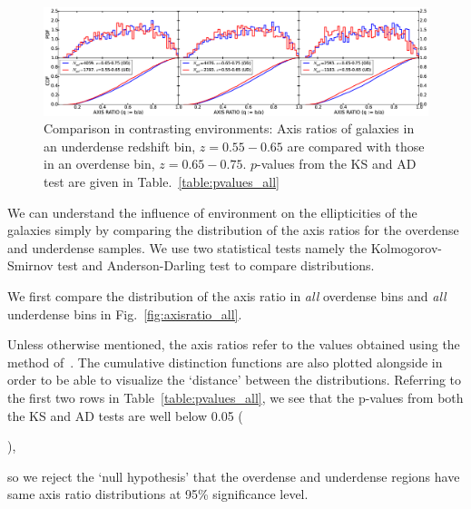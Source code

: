 \documentclass[twocolumn,useAMS,usenatbib]{mn2e}
\newcommand{\rachel}[1]{}
\newcommand{\arun}[1]{}
\begin{document}
\begin{figure}
 \centering
 \includegraphics[width=2.3\columnwidth]{axis_ratio_odud}
 \caption{Comparison in contrasting environments: Axis ratios of galaxies in an underdense redshift bin, $z=0.55-0.65$ are compared with those in an overdense bin, $z=0.65-0.75$. $p$-values from the KS and AD test are given in Table.~\ref{table:pvalues_all}}
 \label{fig:axisratio_contrasting}
\end{figure}

We can understand the influence of environment on the ellipticities of the galaxies simply by comparing the distribution of the axis ratios for the overdense and underdense samples. 
We use two statistical tests namely the Kolmogorov-Smirnov test and Anderson-Darling test to compare distributions.

We first compare the distribution of the axis ratio in \emph{all}
overdense bins and \emph{all} underdense bins in Fig.~\ref{fig:axisratio_all}.
\rachel{How was the volume-limiting carried out for this?  You should say the answer to this question  for all figures.} 
\arun{The caption mentions it.}
Unless otherwise mentioned, the axis ratios refer to the values obtained using the method of~\cite{Claire_Fits}.
The cumulative distinction functions are also plotted alongside in order to be able to visualize the `distance' between the distributions.
Referring to the first two rows in Table~\ref{table:pvalues_all}, we see that the p-values from both the KS and AD tests are well below 0.05
(\rachel{give the actual numbers!} 
\arun{It's in the table.} 
\rachel{The text does not seem to mention the table at all.  If thereaders are to get the numbers from it, then you need to refer to it here and any other place where it is relevant.}), 
\arun{Done.}
so we reject the `null hypothesis' that the overdense and underdense regions have same axis ratio distributions at 95\% significance level.
\end{document}
